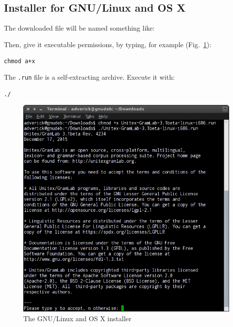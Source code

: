\subsection{Installer for GNU/Linux and OS X}
The downloaded file will be named something like:

\begin{flushleft}
{\tt \UnitexPackageLinux{}}
{\tt \UnitexPackageLinuxSF{}}
\end{flushleft}

\noindent Then, give it executable permissions, by typing, for example (Fig.~\ref{fig-installer-linux}):

\begin{flushleft}
{\tt chmod a+x \UnitexPackageLinux{}}
\end{flushleft}

\noindent The \verb+.run+ file is a self-extracting archive. Execute it with:

\begin{flushleft}
{\tt ./\UnitexPackageLinux{}}
\end{flushleft}

\begin{figure}[!ht]
\begin{center}
\includegraphics[width=13cm]{resources/img/installer-linux.png}
\caption{The GNU/Linux and OS X installer\label{fig-installer-linux}}
\end{center}
\end{figure}

